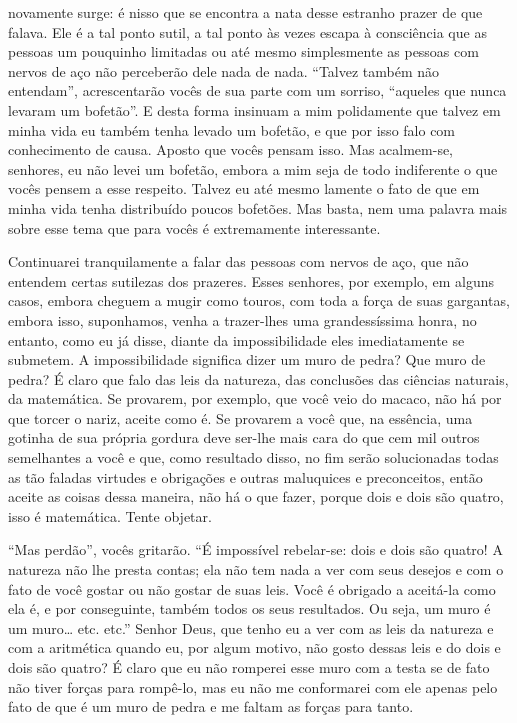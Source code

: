 novamente surge: é nisso que se encontra a nata desse estranho prazer de que
falava. Ele é a tal ponto sutil, a tal ponto às vezes escapa à consciência que
as pessoas um pouquinho limitadas ou até mesmo simplesmente as pessoas com
nervos de aço não perceberão dele nada de nada. “Talvez também não entendam”,
acrescentarão vocês de sua parte com um sorriso, “aqueles que nunca levaram um
bofetão”. E desta forma insinuam a mim polidamente que talvez em minha vida eu
também tenha levado um bofetão, e que por isso falo com conhecimento de causa.
Aposto que vocês pensam isso. Mas acalmem-se, senhores, eu não levei um
bofetão, embora a mim seja de todo indiferente o que vocês pensem a esse
respeito. Talvez eu até mesmo lamente o fato de que em minha vida tenha
distribuído poucos bofetões. Mas basta, nem uma palavra mais sobre esse tema
que para vocês é extremamente interessante.

Continuarei tranquilamente a falar das pessoas com nervos de aço, que
não entendem certas sutilezas dos prazeres. Esses senhores, por
exemplo, em alguns casos, embora cheguem a mugir como touros, com toda
a força de suas gargantas, embora isso, suponhamos, venha a trazer-lhes
uma grandessíssima honra, no entanto, como eu já disse, diante da
impossibilidade eles imediatamente se submetem. A impossibilidade
significa dizer um muro de pedra? Que muro de pedra? É claro que falo
das leis da natureza, das conclusões das ciências naturais, da
matemática. Se provarem, por exemplo, que você veio do macaco, não há
por que torcer o nariz, aceite como é. Se provarem a você que, na
essência, uma gotinha de sua própria gordura deve ser-lhe mais cara do
que cem mil outros semelhantes a você e que, como resultado disso, no
fim serão solucionadas todas as tão faladas virtudes e obrigações e
outras maluquices e preconceitos, então aceite as coisas dessa maneira,
não há o que fazer, porque dois e dois são quatro, isso é matemática.
Tente objetar.

“Mas perdão”, vocês gritarão. “É impossível rebelar-se: dois e dois são
quatro! A natureza não lhe presta contas; ela não tem nada a ver com
seus desejos e com o fato de você gostar ou não gostar de suas leis.
Você é obrigado a aceitá-la como ela é, e por conseguinte, também todos
os seus resultados. Ou seja, um muro é um muro\ldots{} etc. etc.” Senhor
Deus, que tenho eu a ver com as leis da natureza e com a aritmética
quando eu, por algum motivo, não gosto dessas leis e do dois e dois são
quatro? É claro que eu não romperei esse muro com a testa se de fato
não tiver forças para rompê-lo, mas eu não me conformarei com ele
apenas pelo fato de que é um muro de pedra e me faltam as forças para
tanto.

